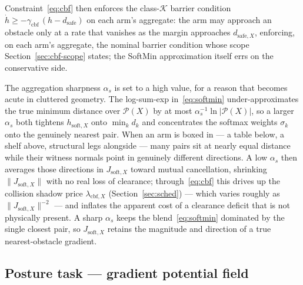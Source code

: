 \documentclass[12pt,a4paper,twoside,openright]{report}
\begin{document}
Constraint~\eqref{eq:cbf} then enforces the class-$\mathcal{K}$ barrier condition $\dot{h} \ge -\gamma_{\text{cbf}}\,(h - d_{\text{safe}})$ on each arm's aggregate: the arm may approach an obstacle only at a rate that vanishes as the margin approaches $d_{\text{safe},X}$, enforcing, on each arm's aggregate, the nominal barrier condition whose scope Section~\ref{sec:cbf-scope} states; the SoftMin approximation itself errs on the conservative side.

The aggregation sharpness $\alpha_s$ is set to a high value, for a reason that becomes acute in cluttered geometry. The log-sum-exp in~\eqref{eq:softmin} under-approximates the true minimum distance over $\mathcal{P}(X)$ by at most $\alpha_s^{-1}\ln|\mathcal{P}(X)|$, so a larger $\alpha_s$ both tightens $h_{\text{soft},X}$ onto $\min_k d_k$ and concentrates the softmax weights $\sigma_k$ onto the genuinely nearest pair. When an arm is boxed in --- a table below, a shelf above, structural legs alongside --- many pairs sit at nearly equal distance while their witness normals point in genuinely different directions. A low $\alpha_s$ then averages those directions in $J_{\text{soft},X}$ toward mutual cancellation, shrinking $\|J_{\text{soft},X}\|$ with no real loss of clearance; through~\eqref{eq:cbf} this drives up the collision shadow price $\lambda_{\text{cbf},X}$ (Section~\ref{sec:sched}) --- which varies roughly as $\|J_{\text{soft},X}\|^{-2}$ --- and inflates the apparent cost of a clearance deficit that is not physically present. A sharp $\alpha_s$ keeps the blend~\eqref{eq:softmin} dominated by the single closest pair, so $J_{\text{soft},X}$ retains the magnitude and direction of a true nearest-obstacle gradient.

\subsection{Posture task --- gradient potential field}
\label{sec:posture}
\end{document}
